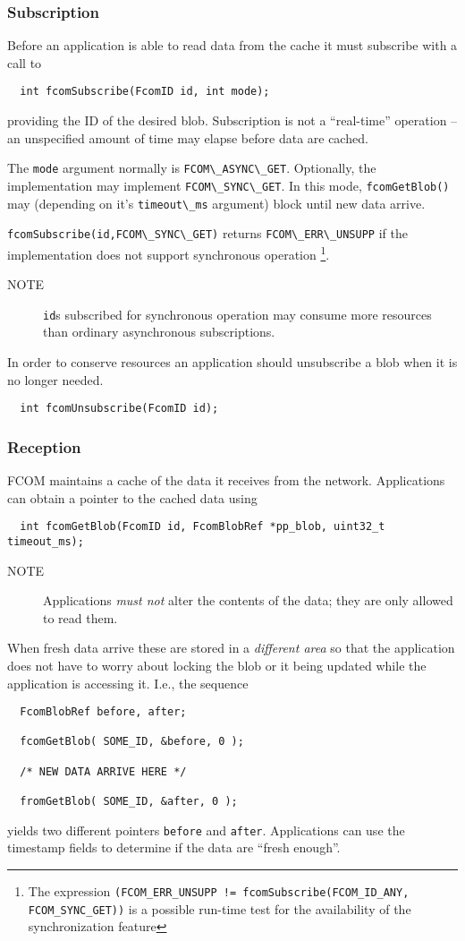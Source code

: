 \documentclass[11pt]{article}
\newcommand{\fcom}{FCOM}
\newcommand{\blob}{blob}
\newcommand{\cstl}[1]{{\lstinline+#1+}}
\newcommand{\note}[1]{
	\begin{description}
		\item[NOTE] #1
	\end{description}
}
\begin{document}
    \subsubsection{Subscription}
      Before an application is able to read data from the cache
      it must subscribe with a call to
      \begin{verbatim}
  int fcomSubscribe(FcomID id, int mode);
      \end{verbatim}
      providing the ID of the desired \blob{}. Subscription is
      not a ``real-time'' operation -- an unspecified amount of
      time may elapse before data are cached.

      The \cstl{mode} argument normally is \cstl{FCOM\_ASYNC\_GET}.
      Optionally, the implementation may implement \cstl{FCOM\_SYNC\_GET}.
      In this mode, \cstl{fcomGetBlob()} may (depending on
      it's \cstl{timeout\_ms} argument) block until new
      data arrive.

      \cstl{fcomSubscribe(id,FCOM\_SYNC\_GET)} returns
      \cstl{FCOM\_ERR\_UNSUPP} if the implementation does not support
      synchronous operation%
\footnote{
The expression
{\tt (FCOM\_ERR\_UNSUPP != fcomSubscribe(FCOM\_ID\_ANY, FCOM\_SYNC\_GET))}
is a possible run-time test for the availability of the
synchronization feature%
}.

      \note{\cstl{id}s subscribed for synchronous operation
      may consume more resources than ordinary asynchronous
      subscriptions.}

      In order to conserve resources an application should
      unsubscribe a \blob{} when it is no longer needed.

      \begin{verbatim}
  int fcomUnsubscribe(FcomID id);
      \end{verbatim}
    \subsubsection{Reception}
      \fcom{} maintains a cache of the data it receives from
      the network. Applications can obtain a pointer to the
      cached data using
      \begin{verbatim}
  int fcomGetBlob(FcomID id, FcomBlobRef *pp_blob, uint32_t timeout_ms);
      \end{verbatim}
      \note{Applications {\em must not} alter the
      contents of the data; they are only allowed to read
      them.}

      When fresh data arrive these are stored in a {\em different
      area} so that the application does not have to worry
      about locking the \blob{} or it being updated while
      the application is accessing it. I.e., the sequence
      \begin{verbatim}
  FcomBlobRef before, after;

  fcomGetBlob( SOME_ID, &before, 0 );

  /* NEW DATA ARRIVE HERE */

  fromGetBlob( SOME_ID, &after, 0 );
      \end{verbatim}
      yields two different pointers {\tt before} and
      {\tt after}. Applications can use the timestamp fields
      to determine if the data are ``fresh enough''.
\end{document}
